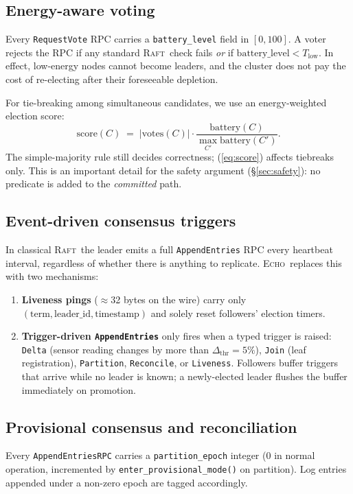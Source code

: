 \documentclass[conference]{IEEEtran}
\newcommand{\echoproto}{\textsc{Echo}\xspace}
\newcommand{\raftproto}{\textsc{Raft}\xspace}
\begin{document}
\subsection{Energy-aware voting}
Every \texttt{RequestVote} RPC carries a \texttt{battery\_level} field
in $[0,100]$. A voter rejects the RPC if any standard \raftproto\ check
fails \emph{or} if $\text{battery\_level} < T_{\text{low}}$. In effect,
low-energy nodes cannot become leaders, and the cluster does not pay the
cost of re-electing after their foreseeable depletion.

For tie-breaking among simultaneous candidates, we use an
energy-weighted election score:
\begin{equation}
  \text{score}(C) \;=\; |\mathrm{votes}(C)| \cdot
    \frac{\text{battery}(C)}{\max_{C'}\text{battery}(C')}.
  \label{eq:score}
\end{equation}
The simple-majority rule still decides correctness;
(\ref{eq:score}) affects tiebreaks only. This is an important detail
for the safety argument (\S\ref{sec:safety}): no predicate is added to
the \emph{committed} path.

\subsection{Event-driven consensus triggers}
In classical \raftproto\ the leader emits a full \texttt{AppendEntries}
RPC every heartbeat interval, regardless of whether there is anything
to replicate. \echoproto\ replaces this with two mechanisms:
\begin{enumerate}
\item \textbf{Liveness pings} ($\approx$32 bytes on the wire) carry only
  $(\text{term},\text{leader\_id},\text{timestamp})$ and solely reset
  followers' election timers.
\item \textbf{Trigger-driven \texttt{AppendEntries}} only fires when a
  typed trigger is raised: \texttt{Delta} (sensor reading changes by
  more than $\Delta_{\text{thr}}{=}5\%$), \texttt{Join} (leaf
  registration), \texttt{Partition}, \texttt{Reconcile}, or
  \texttt{Liveness}. Followers buffer triggers that arrive while no
  leader is known; a newly-elected leader flushes the buffer
  immediately on promotion.
\end{enumerate}

\subsection{Provisional consensus and reconciliation}
Every \texttt{AppendEntriesRPC} carries a \texttt{partition\_epoch}
integer (0 in normal operation, incremented by
\texttt{enter\_provisional\_mode()} on partition). Log entries appended
under a non-zero epoch are tagged accordingly.
\end{document}
